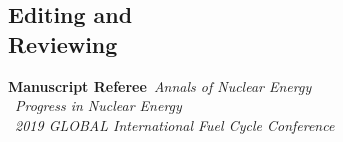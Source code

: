\documentclass[margin,line]{resume}
\begin{document}
\begin{resume}
\section{\mysidestyle Editing and\\Reviewing}
    \textbf{Manuscript Referee}~\hfill \emph{Annals of Nuclear Energy}\\%
    					\mbox{}~\hfill \emph{Progress in Nuclear Energy}\\%
						\mbox{}~\hfill \emph{2019 GLOBAL International Fuel 
    Cycle Conference}\\%

\end{resume}
\end{document}
